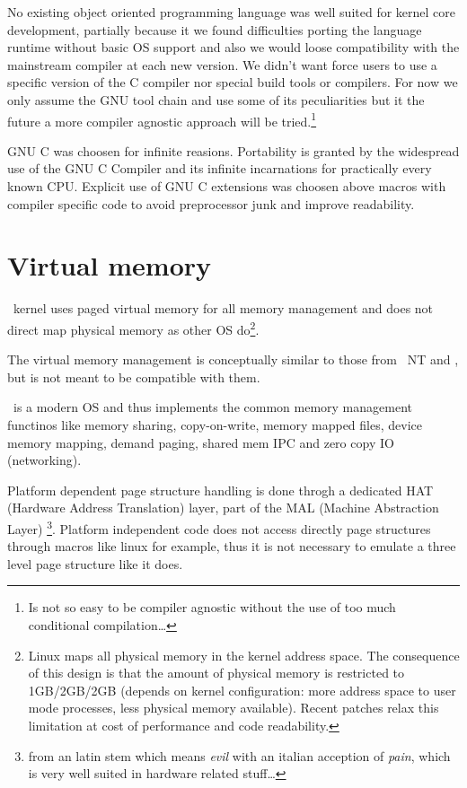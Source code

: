 No existing object oriented programming language was well suited for kernel
core development, partially because it we found difficulties porting the language runtime
without basic OS support and also we would loose compatibility with the mainstream
compiler at each new version. We didn't want force users to use a specific version
of the C compiler nor special build tools or compilers.
 For now we only assume the GNU tool chain and use some of its peculiarities
 but it the future a more compiler agnostic approach will be tried.\footnote{Is not so 
easy to be compiler agnostic without the use of too much conditional compilation\ldots}

GNU C was choosen for infinite reasions. Portability is granted by
the widespread use of the GNU C Compiler and its infinite incarnations
for practically every known CPU. Explicit use of GNU C extensions
was choosen above macros with compiler specific code to avoid preprocessor
junk and improve readability.

\section{Virtual memory}
\acaros\ kernel uses paged virtual memory for all memory management
and does not direct map physical memory as other OS do\footnote{Linux
maps all physical memory in the kernel address space. The consequence
of this design is that the amount of physical memory is restricted
to 1GB/2GB/2GB (depends on kernel configuration: more address space
to user mode processes, less physical memory available). Recent patches
relax this limitation at cost of performance and code readability.}.

The virtual memory management is conceptually similar to those from
\windows\ NT and \solaris, but is not meant to be compatible with them.

\acaros\ is a modern OS and thus implements the common memory management
functinos like memory sharing, copy-on-write, memory mapped files, device memory mapping,
demand paging, shared mem IPC and zero copy IO (networking).

Platform dependent page structure handling is done throgh a dedicated
HAT (Hardware Address Translation) layer, part of the MAL (Machine Abstraction Layer)
\footnote{from an latin stem which means \emph{evil} with an italian acception of \emph{pain}, which is very well suited in hardware related stuff\ldots}.
 Platform independent code does not access directly page structures through
macros like linux for example, thus it is not necessary to emulate a three level
page structure like it does. 

